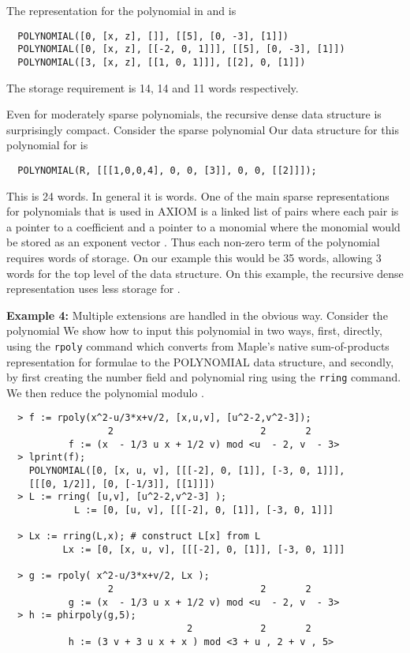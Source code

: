 \documentclass[10pt]{article}
\begin{document}
\medskip
{} The representation for the polynomial
 in  
and  is
\begin{verbatim}
  POLYNOMIAL([0, [x, z], []], [[5], [0, -3], [1]])
  POLYNOMIAL([0, [x, z], [[-2, 0, 1]]], [[5], [0, -3], [1]])
  POLYNOMIAL([3, [x, z], [[1, 0, 1]]], [[2], 0, [1]])
\end{verbatim}
\noindent
The storage requirement is 14, 14 and 11 words respectively.

\medskip
{} Even for moderately sparse polynomials,
the recursive dense data structure is surprisingly compact. Consider
the sparse polynomial  Our data structure for
this polynomial for  is
\begin{verbatim}
  POLYNOMIAL(R, [[[1,0,0,4], 0, 0, [3]], 0, 0, [[2]]]);
\end{verbatim}
\noindent This is 24 words.  In general it is  words. One of
the main sparse representations for polynomials that is used in
AXIOM is a linked list of pairs where each pair is a pointer to a
coefficient and a pointer to a monomial where the monomial  would be stored as an exponent vector .  Thus each
non-zero term of the polynomial requires  words of storage.
On our example this would be 35 words, allowing 3 words for the top
level of the data structure. On this example, the recursive dense
representation uses less storage for .

\medskip
\noindent
{\bf Example 4:} Multiple extensions are handled in the obvious way.
Consider the polynomial 
We show how to input this polynomial in two ways, first,
directly, using the {\tt rpoly} command which
converts from Maple's native sum-of-products
representation for formulae to the POLYNOMIAL data structure,
and secondly, by first creating the number field and
polynomial ring using the {\tt rring} command.
We then reduce the polynomial  modulo .
{
\begin{verbatim}
  > f := rpoly(x^2-u/3*x+v/2, [x,u,v], [u^2-2,v^2-3]);
                  2                          2       2
           f := (x  - 1/3 u x + 1/2 v) mod <u  - 2, v  - 3>
  > lprint(f);
    POLYNOMIAL([0, [x, u, v], [[[-2], 0, [1]], [-3, 0, 1]]],
    [[[0, 1/2]], [0, [-1/3]], [[1]]])
  > L := rring( [u,v], [u^2-2,v^2-3] );
            L := [0, [u, v], [[[-2], 0, [1]], [-3, 0, 1]]]

  > Lx := rring(L,x); # construct L[x] from L
          Lx := [0, [x, u, v], [[[-2], 0, [1]], [-3, 0, 1]]]

  > g := rpoly( x^2-u/3*x+v/2, Lx );
                  2                          2       2
           g := (x  - 1/3 u x + 1/2 v) mod <u  - 2, v  - 3>
  > h := phirpoly(g,5);
                                2            2       2
           h := (3 v + 3 u x + x ) mod <3 + u , 2 + v , 5>
\end{verbatim}
}
\end{document}
